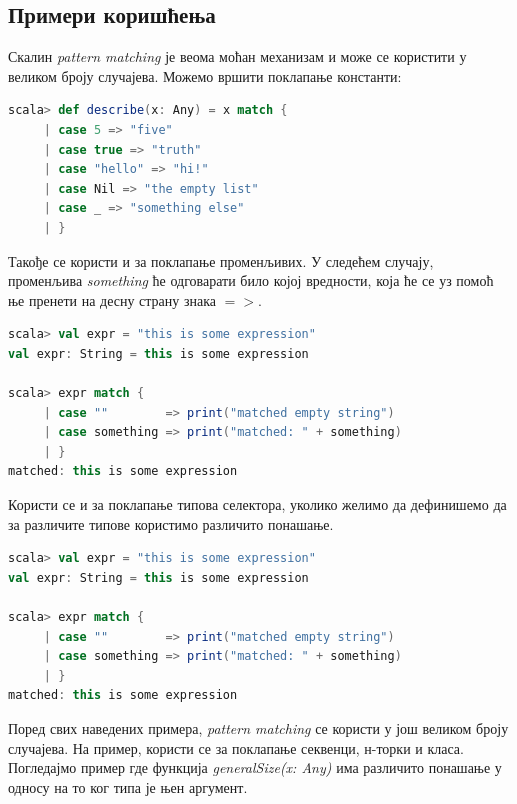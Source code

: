 \documentclass[12pt,oneside]{memoir}
\begin{document}
\subsection{Примери коришћења}
\label{subsec:scala_match_exaples}

Скалин \textit{pattern matching} је веома моћан механизам и може се користити у великом броју случајева. Можемо вршити поклапање константи:

\begin{lstlisting}[language=Scala, caption={}, label={lst:}]
scala> def describe(x: Any) = x match {
     | case 5 => "five"
     | case true => "truth"
     | case "hello" => "hi!"
     | case Nil => "the empty list"
     | case _ => "something else"
     | }
\end{lstlisting}

Такође се користи и за поклапање променљивих. У следећем случају, променљива \textit{something} ће одговарати било којој вредности, која ће се уз помоћ ње пренети на десну страну знака $=>$. \cite{scala_prog}

\begin{lstlisting}[language=Scala, caption={}, label={lst:}]
scala> val expr = "this is some expression"
val expr: String = this is some expression

scala> expr match {
     | case ""        => print("matched empty string")
     | case something => print("matched: " + something)
     | }
matched: this is some expression
\end{lstlisting}

Користи се и за поклапање типова селектора, уколико желимо да дефинишемо да за различите типове користимо различито понашање.

\begin{lstlisting}[language=Scala, caption={}, label={lst:}]
scala> val expr = "this is some expression"
val expr: String = this is some expression

scala> expr match {
     | case ""        => print("matched empty string")
     | case something => print("matched: " + something)
     | }
matched: this is some expression
\end{lstlisting}

Поред свих наведених примера, \textit{pattern matching} се користи у још великом броју случајева. На пример, користи се за поклапање секвенци, н-торки и класа. Погледајмо пример где функција \textit{generalSize(x: Any)} има различито понашање у односу на то ког типа је њен аргумент. \cite{scala_prog}
\end{document}
